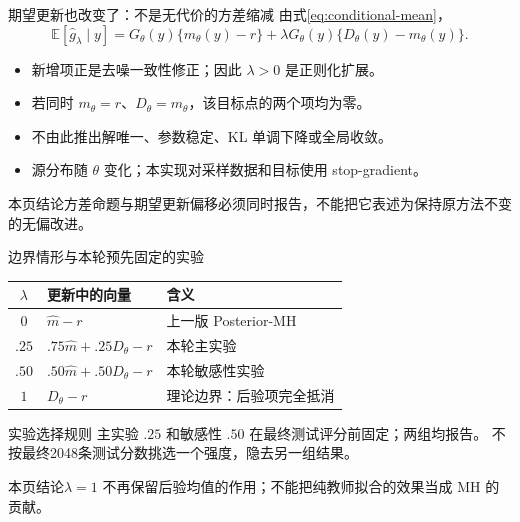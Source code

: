 \documentclass[10pt,aspectratio=169]{beamer}
\newcommand{\E}{\mathbb E}
\newcommand{\takeaway}[1]{\begin{exampleblock}{本页结论}\small #1\end{exampleblock}}
\begin{document}
\begin{frame}{期望更新也改变了：不是无代价的方差缩减}
\small
由式\eqref{eq:conditional-mean}，
\begin{equation}\label{eq:expected-regularized}
\E[\widehat g_\lambda\mid y]
=G_\theta(y)\{m_\theta(y)-r\}
+\lambda G_\theta(y)\{D_\theta(y)-m_\theta(y)\}.
\end{equation}
\begin{itemize}\itemsep4pt
\item 新增项正是去噪一致性修正；因此 $\lambda>0$ 是正则化扩展。
\item 若同时 $m_\theta=r$、$D_\theta=m_\theta$，该目标点的两个项均为零。
\item 不由此推出解唯一、参数稳定、KL 单调下降或全局收敛。
\item 源分布随 $\theta$ 变化；本实现对采样数据和目标使用 stop-gradient。
\end{itemize}
\takeaway{方差命题与期望更新偏移必须同时报告，不能把它表述为保持原方法不变的无偏改进。}
\end{frame}

\begin{frame}{边界情形与本轮预先固定的实验}
\small
\begin{center}
\begin{tabular}{cll}\toprule
$\lambda$ & 更新中的向量 & 含义\\\midrule
$0$ & $\widehat m-r$ & 上一版 Posterior-MH\\
$.25$ & $.75\widehat m+.25D_\theta-r$ & 本轮主实验\\
$.50$ & $.50\widehat m+.50D_\theta-r$ & 本轮敏感性实验\\
$1$ & $D_\theta-r$ & 理论边界：后验项完全抵消\\\bottomrule
\end{tabular}
\end{center}
\begin{alertblock}{实验选择规则}
主实验 $.25$ 和敏感性 $.50$ 在最终测试评分前固定；两组均报告。
不按最终2048条测试分数挑选一个强度，隐去另一组结果。
\end{alertblock}
\takeaway{$\lambda=1$ 不再保留后验均值的作用；不能把纯教师拟合的效果当成 MH 的贡献。}
\end{frame}
\end{document}
